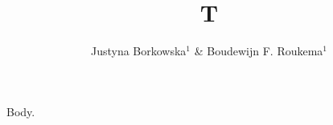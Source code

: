 \documentclass{iopart}
\begin{document}
\title{T}
\author{Justyna Borkowska$^{1}$ \& Boudewijn F. Roukema$^{1}$}
\address{$^1$ Institute of Astronomy, Torun, Poland}
Body.
\end{document}
